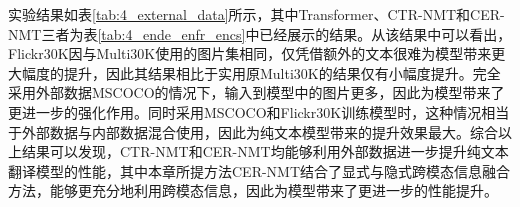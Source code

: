 
实验结果如表\ref{tab:4_external_data}所示，其中Transformer、CTR-NMT和CER-NMT三者为表\ref{tab:4_ende_enfr_encs}中已经展示的结果。从该结果中可以看出，Flickr30K因与Multi30K使用的图片集相同，仅凭借额外的文本很难为模型带来更大幅度的提升，因此其结果相比于实用原Multi30K的结果仅有小幅度提升。完全采用外部数据MSCOCO的情况下，输入到模型中的图片更多，因此为模型带来了更进一步的强化作用。同时采用MSCOCO和Flickr30K训练模型时，这种情况相当于外部数据与内部数据混合使用，因此为纯文本模型带来的提升效果最大。综合以上结果可以发现，CTR-NMT和CER-NMT均能够利用外部数据进一步提升纯文本翻译模型的性能，其中本章所提方法CER-NMT结合了显式与隐式跨模态信息融合方法，能够更充分地利用跨模态信息，因此为模型带来了更进一步的性能提升。
